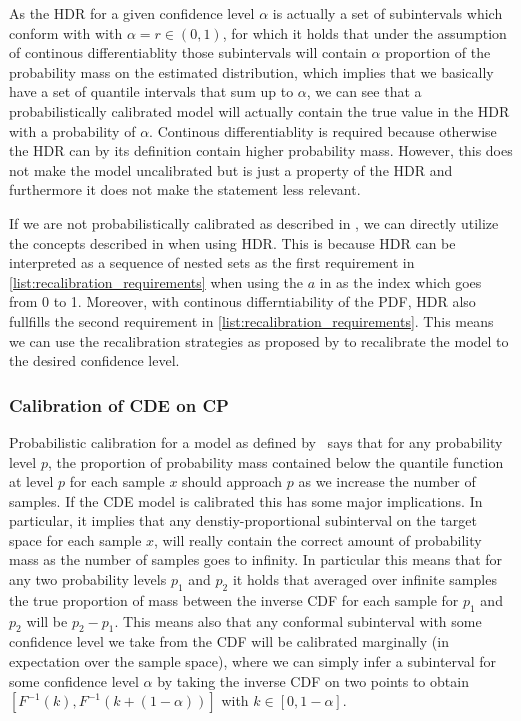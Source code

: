 As the HDR for a given confidence level $\alpha$ is actually a set of subintervals which conform with  with $\alpha = r \in (0,1)$, for which it holds that under the assumption of continous differentiablity those subintervals will contain $\alpha$ proportion of the probability mass on the estimated distribution, which implies that we basically have a set of quantile intervals that sum up to $\alpha$, we can see that a probabilistically calibrated model will actually contain the true value in the HDR with a probability of $\alpha$. Continous differentiablity is required because otherwise the HDR can by its definition contain higher probability mass. However, this does not make the model uncalibrated but is just a property of the HDR and furthermore it does not make the statement less relevant.

If we are not probabilistically calibrated as described in , we can directly utilize the concepts described in  when using HDR. This is because HDR can be interpreted as a sequence of nested sets as the first requirement in \ref{list:recalibration_requirements} when using the $a$ in  as the index which goes from 0 to 1. Moreover, with continous differntiability of the PDF, HDR also fullfills the second requirement in \ref{list:recalibration_requirements}. This means we can use the recalibration strategies as proposed by \cite{sesia2021conformal} to recalibrate the model to the desired confidence level.

\subsubsection{Calibration of CDE on CP}\label{sec:calibration_cde_cp} %

Probabilistic calibration for a model as defined by~\cite{gneiting2007probabilistic} says that for any probability level $p$, the proportion of probability mass contained below the quantile function at level $p$ for each sample $x$ should approach $p$ as we increase the number of samples. If the CDE model is calibrated this has some major implications. In particular, it implies that any denstiy-proportional subinterval on the target space for each sample $x$, will really contain the correct amount of probability mass as the number of samples goes to infinity. In particular this means that for any two probability levels $p_1$ and $p_2$ it holds that averaged over infinite samples the true proportion of mass between the inverse CDF for each sample for $p_1$ and $p_2$ will be $p_2 - p_1$. This means also that any conformal subinterval with some confidence level we take from the CDF will be calibrated marginally (in expectation over the sample space), where we can simply infer a subinterval for some confidence level $\alpha$ by taking the inverse CDF on two points to obtain $[F^{-1}(k), F^{-1}(k + (1 - \alpha))]$ with $k \in [0, 1 - \alpha]$.

